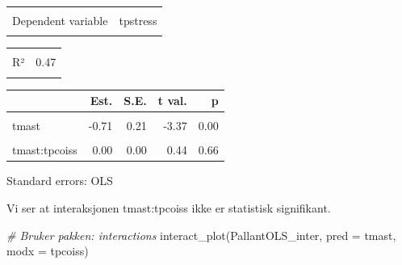\documentclass[
]{article}
\newenvironment{Shaded}{\begin{snugshade}}{\end{snugshade}}
\newcommand{\AttributeTok}[1]{\textcolor[rgb]{0.77,0.63,0.00}{#1}}
\newcommand{\CommentTok}[1]{\textcolor[rgb]{0.56,0.35,0.01}{\textit{#1}}}
\newcommand{\FunctionTok}[1]{\textcolor[rgb]{0.00,0.00,0.00}{#1}}
\newcommand{\NormalTok}[1]{#1}
\begin{document}
\begin{table}[!h]
\centering
\begin{tabular}{lr}
\toprule
\cellcolor{gray!6}{Observations} & \cellcolor{gray!6}{426}\\
Dependent variable & tpstress\\
\cellcolor{gray!6}{Type} & \cellcolor{gray!6}{OLS linear regression}\\
\bottomrule
\end{tabular}
\end{table} \begin{table}[!h]
\centering
\begin{tabular}{lr}
\toprule
\cellcolor{gray!6}{F(3,422)} & \cellcolor{gray!6}{122.82}\\
R² & 0.47\\
\cellcolor{gray!6}{Adj. R²} & \cellcolor{gray!6}{0.46}\\
\bottomrule
\end{tabular}
\end{table} \begin{table}[!h]
\centering
\begin{threeparttable}
\begin{tabular}{lrrrr}
\toprule
  & Est. & S.E. & t val. & p\\
\midrule
\cellcolor{gray!6}{(Intercept)} & \cellcolor{gray!6}{52.66} & \cellcolor{gray!6}{4.34} & \cellcolor{gray!6}{12.13} & \cellcolor{gray!6}{0.00}\\
tmast & -0.71 & 0.21 & -3.37 & 0.00\\
\cellcolor{gray!6}{tpcoiss} & \cellcolor{gray!6}{-0.21} & \cellcolor{gray!6}{0.08} & \cellcolor{gray!6}{-2.72} & \cellcolor{gray!6}{0.01}\\
tmast:tpcoiss & 0.00 & 0.00 & 0.44 & 0.66\\
\bottomrule
\end{tabular}
\begin{tablenotes}
\item Standard errors: OLS
\end{tablenotes}
\end{threeparttable}
\end{table}

Vi ser at interaksjonen tmast:tpcoiss ikke er statistisk signifikant.

\begin{Shaded}
\begin{Highlighting}[]
\CommentTok{\# Bruker pakken: interactions}
\FunctionTok{interact\_plot}\NormalTok{(PallantOLS\_inter, }\AttributeTok{pred =}\NormalTok{ tmast, }\AttributeTok{modx =}\NormalTok{ tpcoiss)}
\end{Highlighting}
\end{Shaded}
\end{document}

